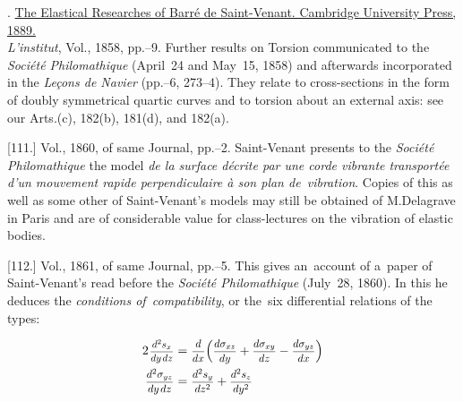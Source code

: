 \begin{tcolorbox}[breakable, enhanced, colback = green!11, before upper={\parindent3.2ex}, parbox = false]
\small%
\setlength{\abovedisplayskip}{2pt}\setlength{\belowdisplayskip}{2pt}%

\noindent
{}. \href{https://archive.org/details/elasticalresear00todhgoog/page/n92/}{The Elastical Researches of Barré de Saint-Venant. Cambridge University Press, 1889.}
\\[.55em]
%
\indent
[110.]
\emph{L’institut}, Vol., 1858, pp.\hbox{--}9. Further results on Torsion communicated to the \emph{Société Philomathique} (April~24 and May~15, 1858) and afterwards incorporated in the \emph{Leçons de Navier} (pp.\hbox{--}6, 273\hbox{--}4). They relate to cross-sections in the form of doubly symmetrical quartic curves and to torsion about an external axis\:: see our Arts.\:(c), 182\:(b), 181\:(d), and 182\:(a).

[111.]
Vol., 1860, of same Journal, pp.\hbox{--}2. Saint-Venant presents to the \emph{Société Philomathique} the model \emph{de la surface décrite par une corde vibrante transportée d’un mouvement rapide perpendiculaire à son plan de~vibration}. Copies of this as well as some other of Saint-Venant’s models may still be obtained of M.\;Delagrave in Paris and are of considerable value for class-lectures on the vibration of elastic bodies.

[112.]
Vol., 1861, of same Journal, pp.\hbox{--}5. This gives an~account of a~paper of Saint-Venant’s read before the \emph{Société Philomathique} (July~28, 1860). In this he deduces the \emph{conditions of~compatibility}, or the~six differential relations of the types\::

\begin{equation*}
\begin{array}{r@{\hspace{.7ex}}c@{\hspace{.7ex}}l}
2 \hspace{.2ex} \scalebox{.8}{$ \displaystyle \frac{d^2 s_{x}}{dy \hspace{.3ex} dz} $}
& = &
\scalebox{.86}{$ \displaystyle \frac{d}{dx} $}
\Bigl(
\scalebox{.86}{$ \displaystyle \frac{d \sigma_{xz}}{dy} $}
+ \scalebox{.86}{$ \displaystyle \frac{d \sigma_{xy}}{dz} $}
- \scalebox{.86}{$ \displaystyle \frac{d \sigma_{yz}}{dx} $}
\Bigr)
\\[.8em]
%
\scalebox{.86}{$ \displaystyle \frac{d^2 \sigma_{yz}}{dy \hspace{.3ex} dz} $}
& = &
\scalebox{.86}{$ \displaystyle \frac{d^2 s_{y}}{dz^2} $}
+ \scalebox{.86}{$ \displaystyle \frac{d^2 s_{z}}{dy^2} $}
\end{array}
\vspace{.2em}\end{equation*}


\end{tcolorbox}
